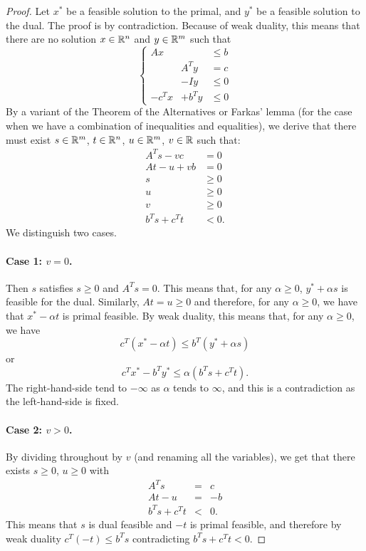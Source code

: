 \documentclass[12pt]{article}
\begin{document}
\begin{proof}
  Let $x^*$ be a feasible solution to the primal, and $y^*$ be a
  feasible solution to the dual. The proof is by contradiction.
  Because of weak duality, this means that there are no solution $x\in
  {\mathbb R}^n$ and $y\in {\mathbb R}^m$ such that
$$\left\{ \begin{array}{lll} Ax & & \leq b \\ & A^T y & =c \\ & -Iy &
    \leq 0 \\ -c^Tx & + b^Ty & \leq 0 \end{array} \right.$$
By a variant of the Theorem of the Alternatives or Farkas' lemma (for
the case when we have a combination of inequalities and equalities),
we derive that there must exist $s\in {\mathbb R}^m$, $t\in {\mathbb R}^n$,
$u\in {\mathbb R}^m$, $v\in {\mathbb R}$ such that:
\begin{eqnarray*}
 A^Ts-vc&=0 \\
 At -u + vb& = 0 \\
s&\geq 0 \\
 u&\geq 0 \\
 v&\geq 0 \\
 b^Ts + c^Tt &< 0.
\end{eqnarray*}
We distinguish two cases. 

\paragraph{Case 1: $v=0$.} Then $s$ satisfies $s\geq 0$ and
$A^Ts=0$. This means that, for any $\alpha\geq 0$, $y^*+\alpha s$ is
feasible for the dual. Similarly, $At=u \geq 0$ and therefore, for any
$\alpha\geq 0$, we have that $x^*-\alpha t$ is primal feasible. By
weak duality, this
means that, for any $\alpha\geq 0$, we have $$c^T(x^*-\alpha t) \leq
b^T(y^*+\alpha s)$$ or $$c^Tx^*-b^Ty^* \leq \alpha (b^Ts+c^Tt).$$
The right-hand-side tend to $-\infty$ as $\alpha$ tends to $\infty$,
and this is a contradiction as the left-hand-side is fixed. 

\paragraph{Case 2: $v>0$.} By dividing throughout by $v$ (and renaming
all the variables), we get that
there exists $s\geq 0$, $u\geq 0$ with 
\begin{eqnarray*}
A^Ts & = & c \\
At-u & = & -b \\
b^Ts + c^T t & < & 0.
\end{eqnarray*}
This means that $s$ is dual feasible and $-t$ is primal feasible, and
therefore by weak duality $c^T(-t) \leq b^Ts$ contradicting $b^Ts+c^Tt<0$. 
\end{proof}
\end{document}
